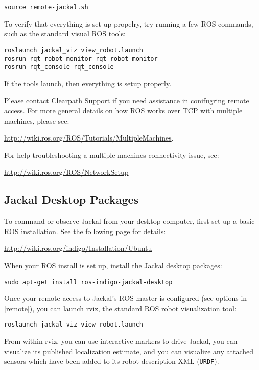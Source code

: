 \documentclass[]{clearpath-latex/clearpath-manual}
\begin{document}
\begin{lstlisting}
source remote-jackal.sh
\end{lstlisting}

To verify that everything is set up propelry, try running a few ROS commands, such as the standard visual ROS tools:

\begin{lstlisting}
roslaunch jackal_viz view_robot.launch
rosrun rqt_robot_monitor rqt_robot_monitor
rosrun rqt_console rqt_console
\end{lstlisting}

If the tools launch, then everything is setup properly.

Please contact Clearpath Support if you need assistance in conifugring remote access. For more general details on how ROS works over TCP with multiple machines, please see:

\url{http://wiki.ros.org/ROS/Tutorials/MultipleMachines}.

For help troubleshooting a multiple machines connectivity issue, see:

\url{http://wiki.ros.org/ROS/NetworkSetup}

\newpage\subsection{Jackal Desktop Packages}

To command or observe Jackal from your desktop computer, first set up a basic
ROS installation. See the following page for details:

\url{http://wiki.ros.org/indigo/Installation/Ubuntu}

When your ROS install is set up, install the Jackal desktop packages:

\begin{lstlisting}
sudo apt-get install ros-indigo-jackal-desktop
\end{lstlisting}

Once your remote access to Jackal's ROS master is configured (see options in \autoref{remote}),
you can launch rviz, the standard ROS robot visualization tool:

\begin{lstlisting}
roslaunch jackal_viz view_robot.launch
\end{lstlisting}

From within rviz, you can use interactive markers to drive Jackal, you can visualize its
published localization estimate, and you can visualize any attached sensors which have been
added to its robot description XML (\lstinline{URDF}).
\end{document}
